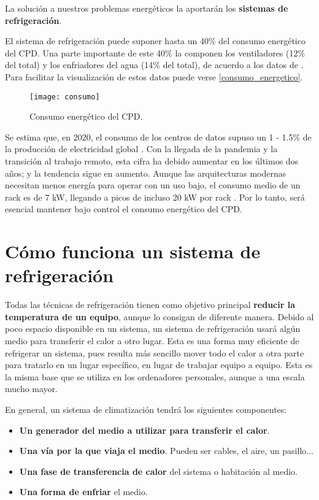La solución a nuestros problemas energéticos la aportarán los \textbf{sistemas de refrigeración}.

El sistema de refrigeración puede suponer hasta un 40\% del consumo energético del CPD. Una parte importante de este 40\% la componen los ventiladores (12\% del total) y los enfriadores del agua (14\% del total), de acuerdo a los datos de \cite{ZHANG2021102253}. Para facilitar la visualización de estos datos puede verse \eqref{consumo_energetico}.

\begin{figure}
    \begin{center}
        \label{consumo_energetico}
        \texttt{[image: consumo]}
        \caption{Consumo energético del CPD.}
    \end{center}
\end{figure}

Se estima que, en 2020, el consumo de los centros de datos supuso un 1 - 1.5\% de la producción de electricidad global \cite{mytton-dc}. Con la llegada de la pandemia y la transición al trabajo remoto, esta cifra ha debido aumentar en los últimos dos años; y la tendencia sigue en aumento. Aunque las arquitecturas modernas necesitan menos energía para operar con un uso bajo, el consumo medio de un rack es de 7 kW, llegando a picos de incluso 20 kW por rack \cite{datacenters-density}. Por lo tanto, será esencial mantener bajo control el consumo energético del CPD. 

\section{Cómo funciona un sistema de refrigeración}

Todas las técnicas de refrigeración tienen como objetivo principal \textbf{reducir la temperatura de un equipo}, aunque lo consigan de diferente manera. Debido al poco espacio disponible en un sistema, un sistema de refrigeración usará algún medio para transferir el calor a otro lugar. Esta es una forma muy eficiente de refrigerar un sistema, pues resulta más sencillo mover todo el calor a otra parte para tratarlo en un lugar específico, en lugar de trabajar equipo a equipo. Esta es la misma base que se utiliza en los ordenadores personales, aunque a una escala mucho mayor.

En general, un sistema de climatización tendrá los siguientes componentes:

\begin{itemize}
    \item \textbf{Un generador del medio a utilizar para transferir el calor}.
    \item \textbf{Una vía por la que viaja el medio}. Pueden ser cables, el aire, un pasillo...
    \item \textbf{Una fase de transferencia de calor} del sistema o habitación al medio.
    \item \textbf{Una forma de enfriar} el medio.
\end{itemize}

